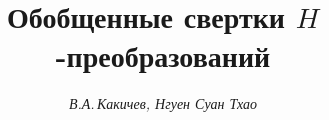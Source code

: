 

 


%  


 


\newcommand{\btu}{\bigtriangleup} 


\newcommand{\tg}{\operatorname{tg}} 


\newcommand{\re}{\operatorname{Re}} 


\newcommand{\sign}{\operatorname{sign}} 


\newcommand{\up}[2]{\overset{#1}{#2}{}} 


\newcommand{\tts}[1]{} 


 




\setcounter{page}{79} 












 


\author{\it В.А.\,Какичев, Нгуен Суан Тхао} 




\title{Обобщенные свертки $H$-преобразований} 


 


\date{} 




\pagestyle{plain} %


 




